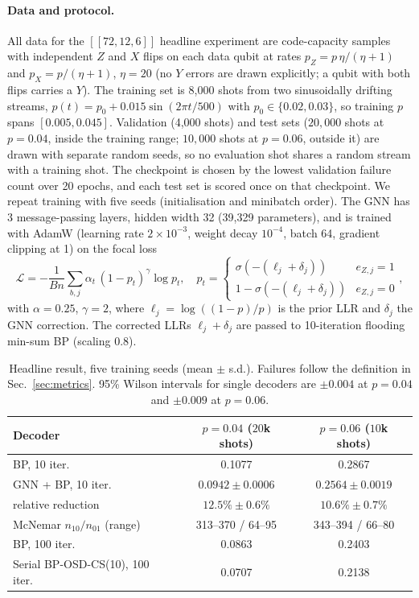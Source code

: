 \paragraph{Data and protocol.}
All data for the $[[72,12,6]]$ headline experiment are code-capacity samples
with independent $Z$ and $X$ flips on each data qubit at rates
$p_Z=p\,\eta/(\eta+1)$ and $p_X=p/(\eta+1)$, $\eta=20$ (no $Y$ errors are
drawn explicitly; a qubit with both flips carries a $Y$).
The training set is 8{,}000 shots from two sinusoidally drifting streams,
$p(t)=p_0+0.015\sin(2\pi t/500)$ with $p_0\in\{0.02,0.03\}$, so training
$p$ spans $[0.005,0.045]$.
Validation (4{,}000 shots) and test sets ($20{,}000$ shots at $p=0.04$,
inside the training range; $10{,}000$ shots at $p=0.06$, outside it) are drawn
with separate random seeds, so no evaluation shot shares a random stream with
a training shot.
The checkpoint is chosen by the lowest validation failure count over 20
epochs, and each test set is scored once on that checkpoint.
We repeat training with five seeds (initialisation and minibatch order).
The GNN has 3 message-passing layers, hidden width 32 (39{,}329 parameters),
and is trained with AdamW (learning rate $2\times10^{-3}$, weight decay
$10^{-4}$, batch 64, gradient clipping at 1) on the focal loss
\begin{equation}
\mathcal{L}=-\frac{1}{Bn}\sum_{b,j}\alpha_t\,(1-p_t)^{\gamma}\log p_t,\quad
p_t=\begin{cases}\sigma(-(\ell_j+\delta_j)) & e_{Z,j}=1\\
1-\sigma(-(\ell_j+\delta_j)) & e_{Z,j}=0\end{cases},
\end{equation}
with $\alpha=0.25$, $\gamma=2$, where $\ell_j=\log((1-p)/p)$ is the prior LLR
and $\delta_j$ the GNN correction.
The corrected LLRs $\ell_j+\delta_j$ are passed to 10-iteration flooding
min-sum BP (scaling 0.8).

\begin{table}[t]
\centering
\caption{Headline result, five training seeds (mean $\pm$ s.d.).
Failures follow the definition in Sec.~\ref{sec:metrics}.
95\% Wilson intervals for single decoders are $\pm0.004$ at $p=0.04$
and $\pm0.009$ at $p=0.06$.}
\label{tab:headline}
\begin{tabular}{lcc}
\hline
Decoder & $p=0.04$ ($20$k shots) & $p=0.06$ ($10$k shots)\\
\hline
BP, 10 iter. & 0.1077 & 0.2867\\
GNN + BP, 10 iter. & $0.0942\pm0.0006$ & $0.2564\pm0.0019$\\
\quad relative reduction & $12.5\%\pm0.6\%$ & $10.6\%\pm0.7\%$\\
\quad McNemar $n_{10}/n_{01}$ (range) & 313--370 / 64--95 & 343--394 / 66--80\\
BP, 100 iter. & 0.0863 & 0.2403\\
Serial BP-OSD-CS(10), 100 iter. & 0.0707 & 0.2138\\
\hline
\end{tabular}
\end{table}

